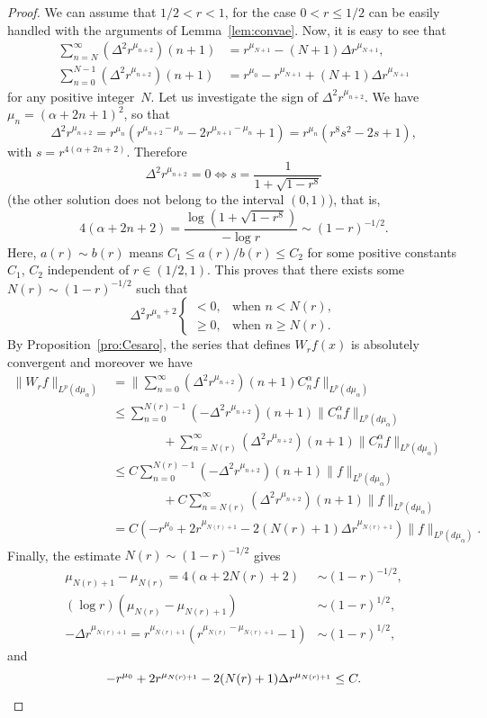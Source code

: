 \documentclass[11pt,a4paper]{amsart}
\newcommand{\mua}{d\mu_\alpha}
\newcommand{\lpnorm}[3]{\|{#1}\|_{L^{#2}({#3})}} %
\newcommand{\Biglpnorm}[3]{\Big\|{#1}\Big\|_{L^{#2}({#3})}} %
\theoremstyle{plain}
\theoremstyle{remark}
\begin{document}
\begin{proof}
We can assume that $1/2 < r < 1$, for the case $0 < r \leq 1/2$ can be easily handled with the arguments of Lemma~\ref{lem:convae}. Now, it is easy to see that
\begin{align*}
  \sum_{n=N}^\infty (\Delta^2 r^{\mu_{n+2}}) (n+1)
  &= r^{\mu_{N+1}} - (N+1) \Delta r^{\mu_{N+1}},
  \\
  \sum_{n=0}^{N-1} (\Delta^2 r^{\mu_{n+2}}) (n+1)
  &= r^{\mu_0} - r^{\mu_{N+1}} + (N+1) \Delta r^{\mu_{N+1}}
\end{align*}
for any positive integer~$N$. Let us investigate the sign of $\Delta^2 r^{\mu_{n+2}}$. We have $\mu_n = (\alpha+2n+1)^2$, so that
\[
   \Delta^2 r^{\mu_{n+2}} = r^{\mu_n}
   (r^{\mu_{n+2}-\mu_n} - 2 r^{\mu_{n+1}-\mu_n} + 1)
   = r^{\mu_n} (r^8 s^2 - 2 s + 1),
\]
with $s = r^{4(\alpha + 2 n + 2)}$. Therefore
\[
   \Delta^2 r^{\mu_{n+2}} = 0
   \iff
   s = \frac{1}{1 + \sqrt{1 - r^8}}
\]
(the other solution does not belong to the interval $(0,1)$), that is,
\[
   4(\alpha + 2 n + 2) = \frac{\log (1 + \sqrt{1 - r^8})}{-\log r} 
   \sim (1-r)^{-1/2}.
\]
Here, $a(r) \sim b(r)$ means $C_1 \leq a(r) / b(r) \leq C_2$ for some positive constants $C_1$, $C_2$ independent of $r \in (1/2,1)$. This proves that there exists some $N(r) \sim (1-r)^{-1/2}$ such that
\[
  \Delta^2 r^{\mu_n+2}
  \begin{cases}
    < 0, & \text{when } n < N(r), \\
    \ge 0, & \text{when } n \ge N(r).
  \end{cases}
\]
By Proposition~\ref{pro:Cesaro}, the series that defines $W_r f(x)$ is absolutely convergent and moreover we have
\begin{align*}
  \lpnorm{W_r f}{p}{\mua}
  &= \Biglpnorm{\sum_{n=0}^\infty (\Delta^2 r^{\mu_{n+2}}) (n+1)
    C_n^\alpha f}{p}{\mua} \\
  &\le \sum_{n=0}^{N(r)-1} (-\Delta^2 r^{\mu_{n+2}}) (n+1)
    \lpnorm{C_n^\alpha f}{p}{\mua} \\
  &\qquad\qquad  + \sum_{n=N(r)}^\infty (\Delta^2 r^{\mu_{n+2}}) (n+1)
    \lpnorm{C_n^\alpha f}{p}{\mua}\\
  &\le C \sum_{n=0}^{N(r)-1} (-\Delta^2 r^{\mu_{n+2}})
    (n+1) \lpnorm{f}{p}{\mua} \\
  &\qquad\qquad + C \sum_{n=N(r)}^\infty (\Delta^2 r^{\mu_{n+2}}) (n+1)
    \lpnorm{f}{p}{\mua} \\
  &= C (-r^{\mu_0} + 2 r^{\mu_{N(r)+1}} - 2 (N(r)+1) \Delta r^{\mu_{N(r)+1}})
    \lpnorm{f}{p}{\mua}.
\end{align*}
Finally, the estimate $N(r) \sim (1-r)^{-1/2}$ gives
\begin{align*}
   \mu_{N(r)+1} - \mu_{N(r)} = 4 (\alpha + 2 N(r) + 2) &\sim (1-r)^{-1/2},
   \\
   (\log r) (\mu_{N(r)} - \mu_{N(r)+1}) &\sim (1-r)^{1/2},
   \\
   - \Delta r^{\mu_{N(r)+1}} 
   = r^{\mu_{N(r)+1}} (r^{\mu_{N(r)} - \mu_{N(r)+1}} - 1)
   &\sim (1-r)^{1/2},
\end{align*}
and
\[
   -r^{\mu_0} + 2 r^{\mu_{N(r)+1}} - 2 (N(r)+1) \Delta r^{\mu_{N(r)+1}}
   \le C.
   \qedhere
\]
\end{proof}
\end{document}
